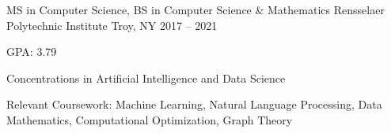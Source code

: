 


\begin{cventries}

  \cventry
  {MS in Computer Science, BS in Computer Science \& Mathematics}
	{Rensselaer Polytechnic Institute}
	{Troy, NY}
	{2017 – 2021}
  {
    \begin{cvitems}
      \item GPA: 3.79
      \item Concentrations in Artificial Intelligence and Data Science
      \item Relevant Coursework: Machine Learning, Natural Language Processing, Data Mathematics, Computational Optimization, Graph Theory
    \end{cvitems}
  }


\end{cventries}